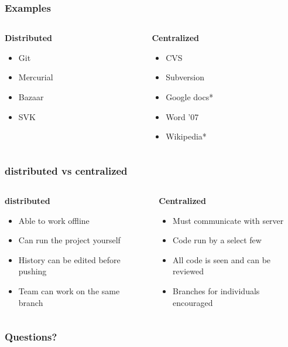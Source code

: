 \documentclass[8pt]{beamer}
\begin{document}
\begin{frame}
	\frametitle{Examples}
	\begin{columns}[T]
		\begin{column}{0.5\textwidth}
			\textbf{Distributed}
			\begin{itemize}
				\item Git
				\item Mercurial
				\item Bazaar
				\item SVK
			\end{itemize}
		\end{column}
		\begin{column}{0.5\textwidth}
			\textbf{Centralized}
			\begin{itemize}
				\item CVS
				\item Subversion
				\item Google docs*
				\item Word '07
				\item Wikipedia*
			\end{itemize}
		\end{column}
	\end{columns}
\end{frame}

\begin{frame}
	\frametitle{distributed vs centralized}
	\begin{columns}[T]
		\begin{column}{0.5\textwidth}
			\textbf{distributed}
			\begin{itemize}
				\item Able to work offline
				\item Can run the project yourself
				\item History can be edited before pushing
				\item Team can work on the same branch
			\end{itemize}
		\end{column}
		\begin{column}{0.5\textwidth}
			\textbf{Centralized}
			\begin{itemize}
				\item Must communicate with server
				\item Code run by a select few
				\item All code is seen and can be reviewed
				\item Branches for individuals encouraged
			\end{itemize}
		\end{column}
	\end{columns}
\end{frame}

\begin{frame}
	\frametitle{Questions?}
\end{frame}
\end{document}
